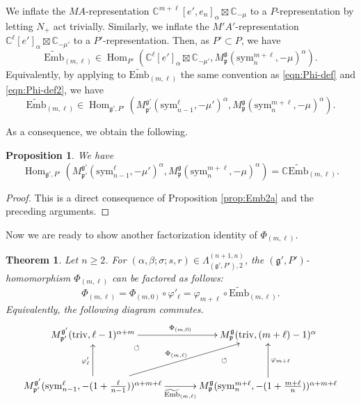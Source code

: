\documentclass[reqno,11pt]{amsart}
\newtheorem{thm}[equation]{Theorem}
\newtheorem{prop}[equation]{Proposition}
\theoremstyle{remark}
\theoremstyle{definition}
\numberwithin{equation}{section}
\newcommand{\ga}{\alpha}
\newcommand{\gL}{\Lambda}
\newcommand{\fg}{{\mathfrak g}}
\newcommand{\fp}{{\mathfrak p}}
\newcommand{\C}{\mathbb{C}}
\newcommand{\Hom}{\operatorname{Hom}}
\newcommand{\triv}{\mathrm{triv}}
\newcommand{\sym}{\mathrm{sym}}
\newcommand{\Mp}{M^{\fg}_{\fp}}
\newcommand{\Mpp}{M^{\fg'}_{\fp'}}
\newcommand{\wEmb}{\widetilde{\mathrm{Emb}}}
\begin{document}
We inflate the $MA$-representation
$\C^{m+\ell}[e',e_n]_\ga\boxtimes \C_{-\mu}$ 
to a $P$-representation by letting $N_+$ act trivially.
Similarly, we inflate the $M'A'$-representation 
$\C^\ell[e']_\ga \boxtimes \C_{-\mu'}$
to a $P'$-representation. 
Then, as $P' \subset P$, we have
\begin{equation*}
\wEmb_{(m,\ell)} \in \Hom_{P'}(\C^\ell[e']_\ga\boxtimes \C_{-\mu'},
\Mp(\sym^{m+\ell}_n, -\mu)^\ga).
\end{equation*}
Equivalently, 
by applying to $\wEmb_{(m,\ell)}$ the same convention
as \eqref{eqn:Phi-def} and \eqref{eqn:Phi-def2}, we have
\begin{equation*}
\wEmb_{(m,\ell)} \in \Hom_{\fg',P'}(\Mpp(\sym^\ell_{n-1},-\mu')^\ga,
\Mp(\sym^{m+\ell}_n, -\mu)^\ga).
\end{equation*}

\noindent
As a consequence, we obtain the following.

\begin{prop}
We have
\begin{equation*}
\Hom_{\fg',P'}(\Mpp(\sym^\ell_{n-1},-\mu')^\ga,
\Mp(\sym^{m+\ell}_n, -\mu)^\ga) = \C\wEmb_{(m,\ell)}.
\end{equation*}
\end{prop}

\begin{proof}
This is a direct consequence of Proposition \ref{prop:Emb2a}
and the preceding arguments.
\end{proof}

Now we are ready to show another factorization identity of $\Phi_{(m,\ell)}$.

\begin{thm}\label{thm:Emb}
Let $n\geq 2$.
For $(\alpha,\beta; \sigma; s, r) \in \gL^{(n+1,n)}_{(\fg', P'),2}$,
the $(\fg', P')$-homomorphism $\Phi_{(m,\ell)}$ can be factored as follows:
\begin{equation}\label{eqn:Homfactor}
\Phi_{(m,\ell)} 
= \Phi_{(m,0)} \circ \varphi'_{\ell}
=\varphi_{m+\ell} \circ \wEmb_{(m,\ell)}.
\end{equation}
Equivalently, the following diagram commutes.
\begin{equation}\label{eqn:comm1}
\begin{aligned}
 \xymatrix@=13pt{
 \Mpp(\triv,\ell-1)^{\ga+m} 
 \ar@{}[rd]|{\circlearrowleft}
 \ar[rr]^{\Phi_{(m,0)}}
 && \Mp(\triv,(m+\ell)-1)^\ga\\
 &&\\
 \Mpp(\sym^\ell_{n-1},-(1+\tfrac{\ell}{n-1}))^{\ga+m+\ell}
\ar[uu]^{\varphi_{\ell}'}
 \ar[rr]_{\wEmb_{(m,\ell)}} \ar[rruu]^{\Phi_{(m,\ell)}} 
&&\Mp(\sym^{m+\ell}_n,-(1+\tfrac{m+\ell}{n}))^{\ga+m+\ell}
\ar[uu]_{\varphi_{m+\ell}}
\ar@{}[luu]|{\circlearrowleft}
}
\end{aligned}
\end{equation}
\end{thm}
\end{document}
